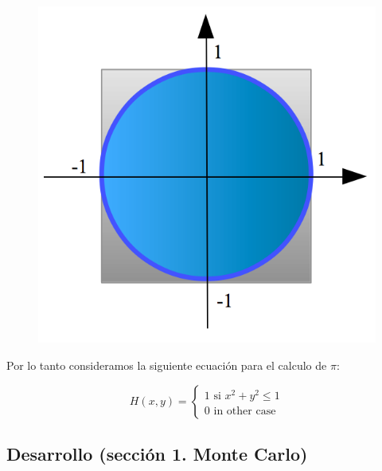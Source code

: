 \documentclass[runningheads,a4paper]{llncs}
\begin{document}
\begin{figure}
\centering
\includegraphics[scale=0.7]{aproximaPi.png}
\end{figure}

Por lo tanto consideramos la siguiente ecuaci\'on para el calculo de $\pi$:

\begin{equation}
H(x,y) = \begin{cases}  1 \text{ si } x^2 + y^2 \leq 1 \\ 
0 \text{ in other case }  \end{cases}
\end{equation}

\subsection{Desarrollo (secci\'on 1. Monte Carlo)}
\end{document}
